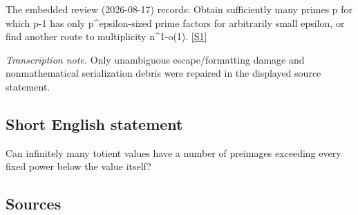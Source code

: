 \documentclass[11pt,a4paper]{article}
\newcommand{\sref}[2]{\hyperlink{source:#1:#2}{[S#2]}}
\begin{document}
The embedded review (2026-08-17) records: Obtain sufficiently many primes p for which p-1 has only p\textasciicircum{}epsilon-sized prime factors for arbitrarily small epsilon, or find another route to multiplicity n\textasciicircum{}{1-o(1)}. \sref{2322}{1}

{\small\emph{Transcription note.} Only unambiguous escape/formatting damage and nonmathematical serialization debris were repaired in the displayed source statement.}

\subsection{Short English statement}

Can infinitely many totient values have a number of preimages exceeding every fixed power below the value itself?

\subsection{Sources}
\end{document}
